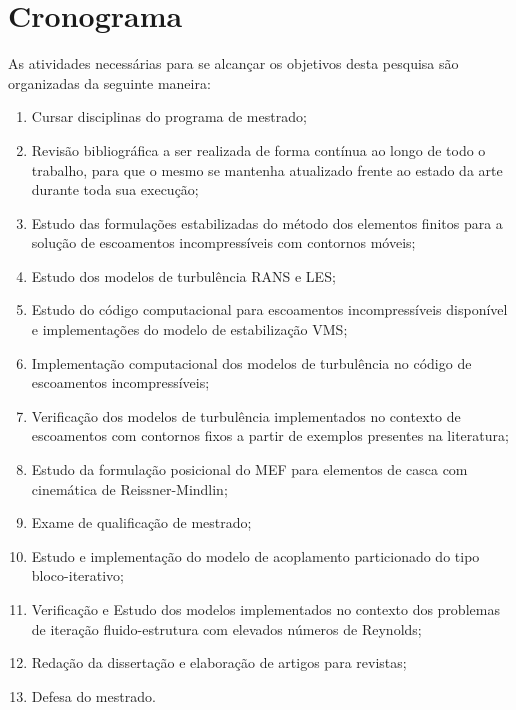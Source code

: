 \section{Cronograma}


As atividades necessárias para se alcançar os objetivos desta pesquisa são organizadas da seguinte maneira:

\begin{enumerate}[label=\alph*.]
	\item\label{M:1} Cursar disciplinas do programa de mestrado;
	\item\label{M:2} Revisão bibliográfica a ser realizada de forma contínua ao longo de todo o trabalho, para que o mesmo se mantenha atualizado frente ao estado da arte durante toda sua execução;
	\item\label{M:3} Estudo das formulações estabilizadas do método dos elementos finitos para a solução de escoamentos incompressíveis com contornos móveis;
	\item\label{M:4} Estudo dos modelos de turbulência RANS e LES;
	\item\label{M:5} Estudo do código computacional para escoamentos incompressíveis disponível e implementações do modelo de estabilização VMS;
	\item\label{M:6} Implementação computacional dos modelos de turbulência no código de escoamentos incompressíveis;
	\item\label{M:7} Verificação dos modelos de turbulência implementados no contexto de escoamentos com contornos fixos a partir de exemplos presentes na literatura;
	\item\label{M:8} Estudo da formulação posicional do MEF para elementos de casca com cinemática de Reissner-Mindlin;
	\item\label{M:9} Exame de qualificação de mestrado;
	\item\label{M:10} Estudo e implementação do modelo de acoplamento particionado do tipo bloco-iterativo;
	\item\label{M:11} Verificação e Estudo dos modelos implementados no contexto dos problemas de iteração fluido-estrutura com elevados números de Reynolds;
	\item\label{M:12} Redação da dissertação e elaboração de artigos para revistas;
	\item \label{M:13} Defesa do mestrado.
\end{enumerate}

